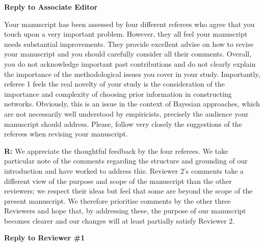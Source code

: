\documentclass[12pt]{letter}
\newenvironment{refquote}{\bigskip \begin{it}}{\end{it}\smallskip}
\begin{document}
\newpage

\setcounter{page}{1}



{\Large \bf Reply to Associate Editor}


	\begin{refquote}
	Your manuscript has been assessed by four different referees who agree that you touch upon a very important problem. However, they all feel your manuscript needs substantial improvements. They provide excellent advise on how to revise your manuscript and you should carefully consider all their comments. Overall, you do not acknowledge important past contributions and do not clearly explain the importance of the methodological issues you cover in your study. Importantly, referee 1 feels the real novelty of your study is the consideration of the importance and complexity of choosing prior information in constructing networks. Obviously, this is an issue in the context of Bayesian approaches, which are not necessarily well understood by empiricists, precisely the audience your manuscript should address. Please, follow very closely the suggestions of the referees when revising your manuscript.

	\end{refquote}

	\textbf{R:} We appreciate the thoughtful feedback by the four referees. We take particular note of the comments regarding the structure and grounding of our introduction and have worked to address this. Reviewer 2's comments take a different view of the purpose and scope of the manuscript than the other reviewers; we respect their ideas but feel that some are beyond the scope of the present manuscript. We therefore prioritise comments by the other three Reviewers and hope that, by addressing these, the purpose of our manuscript becomes clearer and our changes will at least partially satisfy Reviewer 2.


{\Large \bf Reply to Reviewer \#1}
\end{document}
